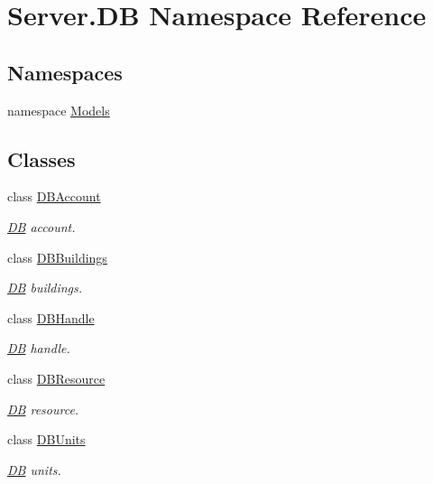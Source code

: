 \hypertarget{namespaceServer_1_1DB}{}\section{Server.\+D\+B Namespace Reference}
\label{namespaceServer_1_1DB}
\subsection*{Namespaces}
\begin{DoxyCompactItemize}
\item 
namespace \hyperlink{namespaceServer_1_1DB_1_1Models}{Models}
\end{DoxyCompactItemize}
\subsection*{Classes}
\begin{DoxyCompactItemize}
\item 
class \hyperlink{classServer_1_1DB_1_1DBAccount}{D\+B\+Account}
\begin{DoxyCompactList}\small\item\em \hyperlink{namespaceServer_1_1DB}{D\+B} account. \end{DoxyCompactList}\item 
class \hyperlink{classServer_1_1DB_1_1DBBuildings}{D\+B\+Buildings}
\begin{DoxyCompactList}\small\item\em \hyperlink{namespaceServer_1_1DB}{D\+B} buildings. \end{DoxyCompactList}\item 
class \hyperlink{classServer_1_1DB_1_1DBHandle}{D\+B\+Handle}
\begin{DoxyCompactList}\small\item\em \hyperlink{namespaceServer_1_1DB}{D\+B} handle. \end{DoxyCompactList}\item 
class \hyperlink{classServer_1_1DB_1_1DBResource}{D\+B\+Resource}
\begin{DoxyCompactList}\small\item\em \hyperlink{namespaceServer_1_1DB}{D\+B} resource. \end{DoxyCompactList}\item 
class \hyperlink{classServer_1_1DB_1_1DBUnits}{D\+B\+Units}
\begin{DoxyCompactList}\small\item\em \hyperlink{namespaceServer_1_1DB}{D\+B} units. \end{DoxyCompactList}\end{DoxyCompactItemize}
